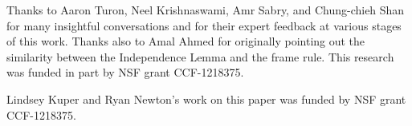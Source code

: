 

Thanks to Aaron Turon, Neel Krishnaswami, Amr Sabry, and
Chung-chieh Shan for many insightful conversations and for their expert feedback at various stages of this work.
Thanks also to Amal Ahmed for originally pointing out the
similarity between the Independence Lemma and the frame rule.  This
research was funded in part by NSF grant CCF-1218375.




Lindsey Kuper and Ryan Newton's work on this paper was funded by NSF grant CCF-1218375.
